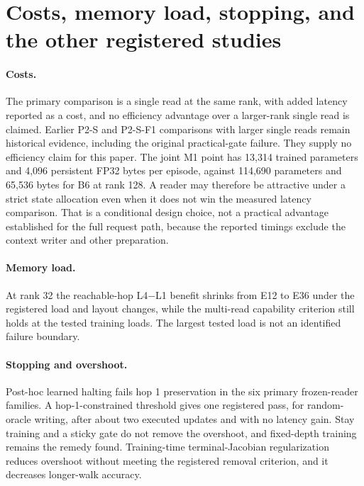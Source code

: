 \section{Costs, memory load, stopping, and the other registered studies}
\label{sec:other}

\paragraph{Costs.}
The primary comparison is a single read at the same rank, with added latency reported as a cost, and no efficiency advantage over a larger-rank single read is claimed.  %
Earlier P2-S and P2-S-F1 comparisons with larger single reads remain historical evidence, including the original practical-gate failure.
They supply no efficiency claim for this paper.  %
The joint M1 point has 13,314 trained parameters and 4,096 persistent FP32 bytes per episode, against 114,690 parameters and 65,536 bytes for B6 at rank 128.  %
A reader may therefore be attractive under a strict state allocation even when it does not win the measured latency comparison.
That is a conditional design choice, not a practical advantage established for the full request path, because the reported timings exclude the context writer and other preparation.  %

\paragraph{Memory load.}
At rank 32 the reachable-hop L4$-$L1 benefit shrinks from E12 to E36 under the registered load and layout changes, while the multi-read capability criterion still holds at the tested training loads.  %
The largest tested load is not an identified failure boundary.

\paragraph{Stopping and overshoot.}
Post-hoc learned halting fails hop 1 preservation in the six primary frozen-reader families.
A hop-1-constrained threshold gives one registered pass, for random-oracle writing, after about two executed updates and with no latency gain.  %
Stay training and a sticky gate do not remove the overshoot, and fixed-depth training remains the remedy found.  %
Training-time terminal-Jacobian regularization reduces overshoot without meeting the registered removal criterion, and it decreases longer-walk accuracy.  %


